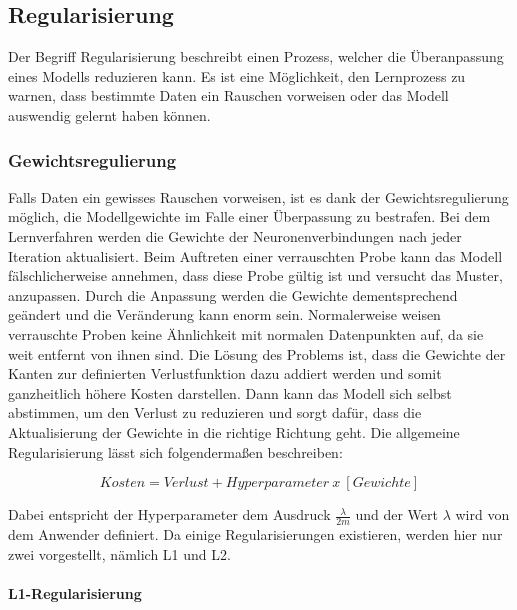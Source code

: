 \subsection{Regularisierung}


Der Begriff Regularisierung beschreibt einen Prozess, welcher die Überanpassung eines Modells reduzieren kann. Es ist eine Möglichkeit, den Lernprozess zu warnen, dass bestimmte Daten ein Rauschen vorweisen oder das Modell auswendig gelernt haben können\cite{Nelli2018}. 


\subsubsection{Gewichtsregulierung}
Falls Daten ein gewisses Rauschen vorweisen, ist es dank der Gewichtsregulierung möglich, die Modellgewichte im Falle einer Überpassung zu bestrafen\cite{Nelli2018,Vasilev2019}. Bei dem Lernverfahren werden die Gewichte der Neuronenverbindungen nach jeder Iteration aktualisiert. Beim Auftreten einer verrauschten Probe kann das Modell fälschlicherweise annehmen, dass diese Probe gültig ist und versucht das Muster, anzupassen\cite{Nelli2018,Subramanian2018}. Durch die Anpassung werden die Gewichte dementsprechend geändert und die Veränderung kann enorm sein. Normalerweise weisen verrauschte Proben keine Ähnlichkeit mit normalen Datenpunkten auf, da sie weit entfernt von ihnen sind. Die Lösung des Problems ist, dass die Gewichte der Kanten zur definierten Verlustfunktion dazu addiert werden und somit ganzheitlich höhere Kosten darstellen. Dann kann das Modell sich selbst abstimmen, um den Verlust zu reduzieren und sorgt dafür, dass die Aktualisierung der Gewichte in die richtige Richtung geht. Die allgemeine Regularisierung lässt sich folgendermaßen beschreiben:

\begin{equation}
Kosten = Verlust + Hyperparameter~x~[Gewichte]
\end{equation}

Dabei entspricht der Hyperparameter dem Ausdruck $\frac{\lambda}{2m}$ und der Wert $\lambda$ wird von dem Anwender definiert. Da einige Regularisierungen existieren, werden hier nur zwei vorgestellt, nämlich L1 und L2.


\paragraph{L1-Regularisierung}
~\newline


